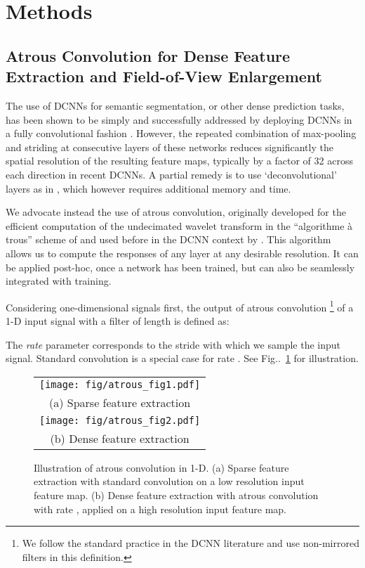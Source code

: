 \documentclass[10pt,journal,compsoc]{IEEEtran}
\makeatletter
\newcommand{\figref}[1]{Fig\onedot~\ref{#1}}
\def\onedot{\ifx\@let@token.\else.\null\fi\xspace}
\makeatother
\begin{document}
 \section{Methods}
\label{sec:methods}

\subsection{Atrous Convolution for Dense Feature Extraction and Field-of-View Enlargement}
\label{sec:convnet-hole}
The use of DCNNs for semantic segmentation, or other dense prediction tasks, has been shown to be
simply and successfully addressed by deploying DCNNs in a fully convolutional fashion \cite{sermanet2013overfeat, long2014fully}.
 However, the repeated combination of max-pooling and striding
 at consecutive layers of these networks reduces significantly the spatial resolution of the
 resulting feature maps, typically by a factor of 32 across each direction in recent DCNNs.
 A partial remedy is to use `deconvolutional' layers as  in  \cite{long2014fully},
which however requires additional memory and time.
 
We advocate instead the use of atrous convolution, originally developed for the efficient computation of the
undecimated wavelet transform in the ``algorithme \`a trous'' scheme of
\cite{holschneider1989real} and used before in the DCNN context by
\cite{giusti2013fast, sermanet2013overfeat, papandreou2014untangling}.
This algorithm allows us to compute the responses of any layer at any desirable resolution.
It can be applied post-hoc, once a network has been trained, but can also be seamlessly integrated with training.

Considering one-dimensional signals first, the output  of atrous convolution \footnote{We follow the
standard practice in the DCNN literature and use non-mirrored filters in this
definition.} of a 1-D input signal  with a filter  of length  is
defined as:

The \emph{rate} parameter  corresponds to the stride with which we sample the
input signal. Standard convolution is a special case for rate .
See \figref{fig:hole} for illustration.

 \begin{figure}
  \begin{tabular}{c}
\texttt{[image: fig/atrous\_fig1.pdf]} \\
    {\scriptsize (a) Sparse feature extraction} \\
    \texttt{[image: fig/atrous\_fig2.pdf]} \\
    {\scriptsize (b) Dense feature extraction} \\
  \end{tabular}
  \caption{Illustration of atrous convolution in 1-D. (a) Sparse feature
    extraction with standard convolution on a low resolution input feature map.
    (b) Dense feature extraction with atrous convolution with rate ,
    applied on a high resolution input feature map.}
  \label{fig:hole}
\end{figure}
\end{document}
